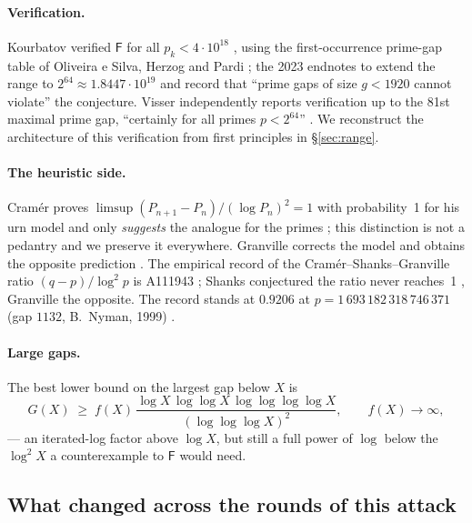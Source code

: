 \documentclass[11pt,a4paper]{article}
\theoremstyle{plain}
\theoremstyle{definition}
\theoremstyle{remark}
\newcommand{\Fb}{\mathsf{F}}
\begin{document}
\paragraph{Verification.}
Kourbatov verified $\Fb$ for all $p_k < 4\cdot 10^{18}$
\cite[\S4, Thm.]{kourbatov2015verification}, using the first-occurrence prime-gap table of
Oliveira e Silva, Herzog and Pardi \cite{oliveira2014goldbach}; the 2023 endnotes to
\cite{kourbatov2015verification} extend the range to $2^{64} \approx 1.8447\cdot10^{19}$ and
record that ``prime gaps of size $g < 1920$ cannot violate'' the conjecture. Visser
independently reports verification up to the 81st maximal prime gap, ``certainly for all
primes $p < 2^{64}$'' \cite[Abstract, \S1]{visser2019verifying}. We reconstruct the
architecture of this verification from first principles in \S\ref{sec:range}.

\paragraph{The heuristic side.}
Cram\'er proves $\limsup (P_{n+1}-P_n)/(\log P_n)^2 = 1$ with probability~1 for his urn
model and only \emph{suggests} the analogue for the primes
\cite[pp.~24, 26--27]{cramer1936order}; this distinction is not a pedantry and we preserve it
everywhere. Granville corrects the model and obtains the opposite prediction
\cite[preprint pp.~10, 12]{granville1995cramer}. The empirical record of the
Cram\'er--Shanks--Granville ratio $(q-p)/\log^2 p$ is A111943 \cite{oeisA111943}; Shanks
conjectured the ratio never reaches~1 \cite{shanks1964maximal}, Granville the opposite. The
record stands at $0.9206$ at $p = 1\,693\,182\,318\,746\,371$ (gap $1132$, B.~Nyman, 1999)
\cite{oeisA111943}.

\paragraph{Large gaps.}
The best lower bound on the largest gap below $X$ is
\[
G(X) \;\ge\; f(X)\,\frac{\log X \,\log\log X \,\log\log\log\log X}{(\log\log\log X)^2},
\qquad f(X)\to\infty ,
\]
\cite{ford2016large} --- an iterated-log factor above $\log X$, but still a
full power of $\log$ below the $\log^2 X$ a counterexample to $\Fb$ would need.

\subsection{What changed across the rounds of this attack}
\label{sec:rounds}
\end{document}
